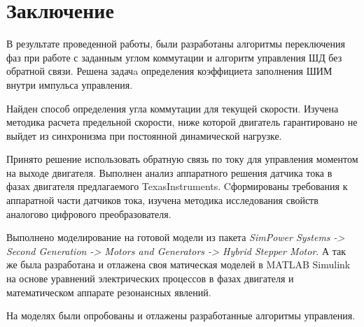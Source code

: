\documentclass{article}
\begin{document}
\section{Заключение}

В результате проведенной работы, были разработаны алгоритмы переключения фаз при
работе с заданным углом коммутации и алгоритм управления ШД без обратной связи.
Решена задачa определения коэффициета заполнения ШИМ внутри импульса
управления.

Найден способ определения угла коммутации для текущей скорости. Изучена методика
расчета предельной скорости, ниже которой двигатель гарантировано не выйдет из
синхронизма при постоянной динамической нагрузке.

Принято решение использовать обратную связь по току для управления моментом на
выходе двигателя. Выполнен анализ аппаратного решения датчика тока в фазах двигателя
предлагаемого TexasInstruments. Cформированы требования к аппаратной части датчиков
тока, изучена методика исследования свойств аналогово цифрового преобразователя.

Выполнено моделирование на готовой модели из пакета
\textit{SimPower Systems -> Second Generation -> Motors and Generators -> Hybrid Stepper Motor}.
А так же была разработана и отлажена своя матическая моделей в MATLAB Simulink на основе
уравнений электрических процессов в фазах двигателя и математическом аппарате резонансных явлений.

На моделях были опробованы и отлажены разработанные алгоритмы управления.


\end{document}
